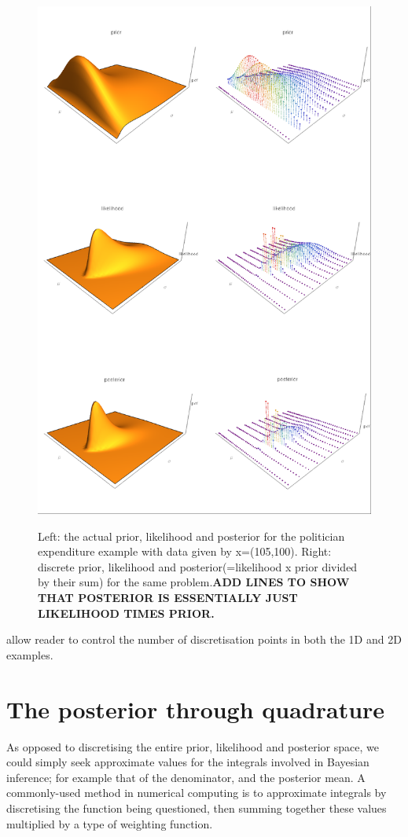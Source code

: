 \documentclass[11pt,fullpage]{book}
\begin{document}
\begin{figure}
\centering
\scalebox{0.4} 
{\includegraphics{MCMC_discreteApprox2DPolitician.png}}
\caption{Left: the actual prior, likelihood and posterior for the politician expenditure example with data given by x=(105,100). Right: discrete prior, likelihood and posterior(=likelihood x prior divided by their sum) for the same problem.\textbf{ADD LINES TO SHOW THAT POSTERIOR IS ESSENTIALLY JUST LIKELIHOOD TIMES PRIOR.}}\label{fig:MCMC_discreteApprox2DPolitician}
\end{figure}

 allow reader to control the number of discretisation points in both the 1D and 2D examples.

\section{The posterior through quadrature}
As opposed to discretising the entire prior, likelihood and posterior space, we could simply seek approximate values for the integrals involved in Bayesian inference; for example that of the denominator, and the posterior mean. A commonly-used method in numerical computing is to approximate integrals by discretising the function being questioned, then summing together these values multiplied by a type of weighting function. 
\end{document}
